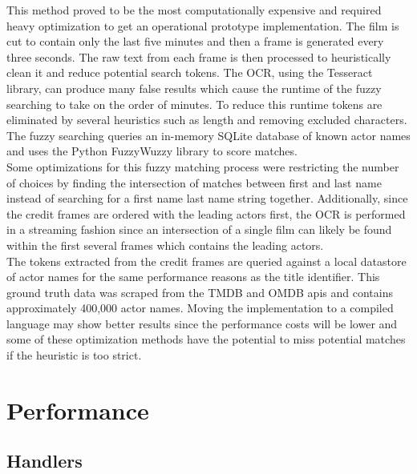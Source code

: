 \documentclass[paper=a4, fontsize=11pt]{scrartcl} %
\numberwithin{equation}{section} %
\numberwithin{figure}{section} %
\numberwithin{table}{section} %
\begin{document}
This method proved to be the most computationally expensive and required heavy optimization to get an operational prototype implementation. The film is cut to contain only the last five minutes and then a frame is generated every three seconds. The raw text from each frame is then processed to heuristically clean it and reduce potential search tokens. The OCR, using the Tesseract library, can produce many false results which cause the runtime of the fuzzy searching to take on the order of minutes. To reduce this runtime tokens are eliminated by several heuristics such as length and removing excluded characters. The fuzzy searching queries an in-memory SQLite database of known actor names and uses the Python FuzzyWuzzy library to score matches. \\

Some optimizations for this fuzzy matching process were restricting the number of choices by finding the intersection of matches between first and last name instead of searching for a first name last name string together. Additionally, since the credit frames are ordered with the leading actors first, the OCR is performed in a streaming fashion since an intersection of a single film can likely be found within the first several frames which contains the leading actors. \\

The tokens extracted from the credit frames are queried against a local datastore of actor names for the same performance reasons as the title identifier. This ground truth data was scraped from the TMDB and OMDB apis and contains approximately 400,000 actor names. Moving the implementation to a compiled language may show better results since the performance costs will be lower and some of these optimization methods have the potential to miss potential matches if the heuristic is too strict. \\

\section{Performance}
\label{sec:performance}


\subsection{Handlers}
\label{sec:handlers}
\end{document}
